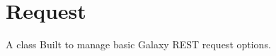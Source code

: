 \hypertarget{group__request__class}{}\section{Request}
\label{group__request__class}
A class Built to manage basic Galaxy R\+E\+ST request options. 